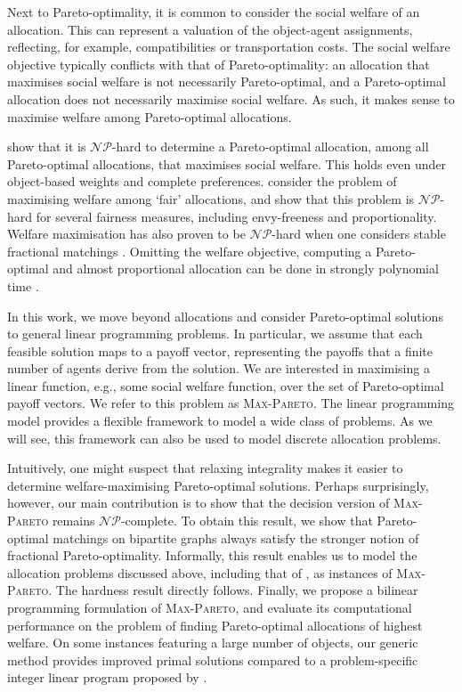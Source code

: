 \documentclass[a4paper, 11pt]{article}
\newcommand{\mc}{\mathcal}
\begin{document}
Next to Pareto-optimality, it is common to consider the social welfare of an allocation. This can represent a valuation of the object-agent assignments, reflecting, for example, compatibilities or transportation costs. The social welfare objective typically conflicts with that of Pareto-optimality: an allocation that maximises social welfare is not necessarily Pareto-optimal, and a Pareto-optimal allocation does not necessarily maximise social welfare. As such, it makes sense to maximise welfare among Pareto-optimal allocations. 

\citet{biro2021complexity} show that it is $\mc{NP}$-hard to determine a Pareto-optimal allocation, among all Pareto-optimal allocations, that maximises social welfare. This holds even under object-based weights and complete preferences. \citet{aziz2023computing} consider the problem of maximising welfare among `fair' allocations, and show that this problem is $\mc{NP}$-hard for several fairness measures, including envy-freeness and proportionality. Welfare maximisation has also proven to be $\mc{NP}$-hard when one considers stable fractional matchings \citep{caragiannis2019stable}. Omitting the welfare objective, computing a Pareto-optimal and almost proportional allocation can be done in strongly polynomial time \citep{aziz2020polynomial}.

In this work, we move beyond allocations and consider Pareto-optimal solutions to general linear programming problems. In particular, we assume that each feasible solution maps to a payoff vector, representing the payoffs that a finite number of agents derive from the solution. We are interested in maximising a linear function, e.g., some social welfare function, over the set of Pareto-optimal payoff vectors. We refer to this problem as \textsc{Max-Pareto}. The linear programming model provides a flexible framework to model a wide class of problems. As we will see, this framework can also be used to model discrete allocation problems.

Intuitively, one might suspect that relaxing integrality makes it easier to determine welfare-maximising Pareto-optimal solutions. Perhaps surprisingly, however, our main contribution is to show that the decision version of \textsc{Max-Pareto} remains $\mc{NP}$-complete. To obtain this result, we show that Pareto-optimal matchings on bipartite graphs always satisfy the stronger notion of fractional Pareto-optimality. Informally, this result enables us to model the allocation problems discussed above, including that of \citep{biro2021complexity}, as instances of \textsc{Max-Pareto}. The hardness result directly follows. Finally, we propose a bilinear programming formulation of \textsc{Max-Pareto}, and evaluate its computational performance on the problem of finding Pareto-optimal allocations of highest welfare. On some instances featuring a large number of objects, our generic method provides improved primal solutions compared to a problem-specific integer linear program proposed by \citet{biro2021complexity}.
\end{document}
